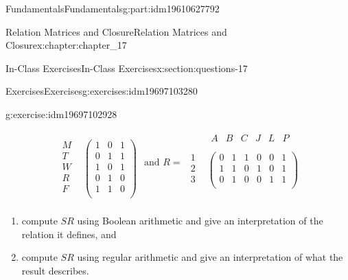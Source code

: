 \documentclass[oneside,10pt,]{book}
\numberwithin{equation}{section}
\begin{document}
\begin{partptx}{Fundamentals}{}{Fundamentals}{}{}{g:part:idm19610627792}
\begin{chapterptx}{Relation Matrices and Closure}{}{Relation Matrices and Closure}{}{}{x:chapter:chapter_17}
\begin{sectionptx}{In-Class Exercises}{}{In-Class Exercises}{}{}{x:section:questions-17}
\begin{exercises-subsection-numberless}{Exercises}{}{Exercises}{}{}{g:exercises:idm19697103280}
\begin{exercisegroup}
\begin{divisionexerciseeg}{1}{}{}{g:exercise:idm19697102928}
\begin{equation*}
\begin{array}{cc}
\begin{array}{ccc}
\end{array}
\\
\begin{array}{c}
M \\
T \\
W \\
R \\
F \\
\end{array}
& 
\left(
\begin{array}{ccc}
1 & 0 & 1 \\
0 & 1 & 1 \\
1 & 0 & 1 \\
0 & 1 & 0 \\
1 & 1 & 0 \\
\end{array}
\right) \\
\end{array}
\textrm{ and }R=
\begin{array}{cc}
& 
\begin{array}{cccccc}
A & B & C & J & L & P \\
\end{array}
\\
\begin{array}{c}
1 \\
2 \\
3 \\
\end{array}
& \left(
\begin{array}{cccccc}
0 & 1 & 1 & 0 & 0 & 1 \\
1 & 1 & 0 & 1 & 0 & 1 \\
0 & 1 & 0 & 0 & 1 & 1 \\
\end{array}
\right) \\
\end{array}
\end{equation*}
%
\par
%
\begin{enumerate}[label=(\alph*)]
\item{}compute \(S R\) using Boolean arithmetic and give an interpretation of the relation it defines, and%
\item{}compute \(S R\) using regular arithmetic and give an interpretation of what the result describes.%
\end{enumerate}
%
\end{divisionexerciseeg}%
\end{exercisegroup}
\end{exercises-subsection-numberless}
\end{sectionptx}
\end{chapterptx}
\end{partptx}
\end{document}

